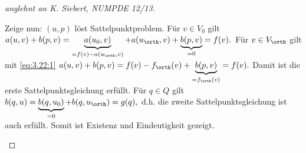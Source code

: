 \begin{st}
\begin{proof}[anglehnt an K. Siebert, NUMPDE 12/13]
\begin{seg}[\ProofImplication*]
			Zeige nun: $(u,p)$ löst Sattelpunktproblem.
			Für $v \in V_0$ gilt
			\begin{math}
				a(u,v) + b(p,v)
				= \underbrace{a(u_0,v)}_{=f(v) - a(u_\orth, v)} + a(u_\orth, v ) + \underbrace{b(p,v)}_{=0}
				= f(v).
			\end{math}
			Für $v \in V_\orth$ gilt mit \eqref{eq:3.22:1}
			\begin{math}
				a(u,v) + b(p,v)
				= f(v) - f_\orth(v) + \underbrace{b(p,v)}_{=f_\orth(v)}
				= f(v).
			\end{math}
			Damit ist die erste Sattelpunktsgleichung erfüllt.
			Für $q \in Q$ gilt
			\begin{math}
				b(q,u)
				= \underbrace{b(q, u_0)}_{=0} + b(q, u_\orth)
				= g(q),
			\end{math}
			d.h. die zweite Sattelpunktsgleichung ist auch erfüllt.
			Somit ist Existenz und Eindeutigkeit gezeigt.


\end{seg}
\end{proof}
\end{st}
